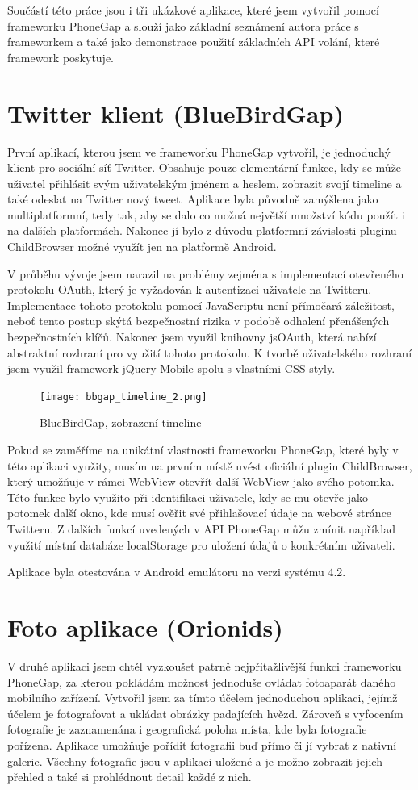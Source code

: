 Součástí této práce jsou i tři ukázkové aplikace, které jsem vytvořil pomocí frameworku PhoneGap a slouží jako základní seznámení autora práce s frameworkem a také jako demonstrace použití základních API volání, které framework poskytuje.

\section{Twitter klient (BlueBirdGap)}
První aplikací, kterou jsem ve frameworku PhoneGap vytvořil, je jednoduchý klient pro sociální síť Twitter. Obsahuje pouze elementární funkce, kdy se může uživatel přihlásit svým uživatelským jménem a heslem, zobrazit svojí timeline a také odeslat na Twitter nový tweet. Aplikace byla původně zamýšlena jako multiplatformní, tedy tak, aby se dalo co možná největší množství kódu použít i na dalších platformách. Nakonec jí bylo z důvodu platformní závislosti pluginu ChildBrowser možné využít jen na platformě Android.

V průběhu vývoje jsem narazil na problémy zejména s implementací otevřeného protokolu OAuth, který je vyžadován k autentizaci uživatele na Twitteru. Implementace tohoto protokolu pomocí JavaScriptu není přímočará záležitost, neboť tento postup skýtá bezpečnostní rizika v podobě odhalení přenášených bezpečnostních klíčů. Nakonec jsem využil knihovny jsOAuth, která nabízí abstraktní rozhraní pro využití tohoto protokolu. K tvorbě uživatelského rozhraní jsem využil framework jQuery Mobile spolu s vlastními CSS styly.

\begin{figure}[htbp]\centering
\texttt{[image: bbgap\_timeline\_2.png]}
\caption{BlueBirdGap, zobrazení timeline}
\label{fig:BbGapTimeline}
\end{figure}

Pokud se zaměříme na unikátní vlastnosti frameworku PhoneGap, které byly v této aplikaci využity, musím na prvním místě uvést oficiální plugin ChildBrowser, který umožňuje v rámci WebView otevřít další WebView jako svého potomka. Této funkce bylo využito při identifikaci uživatele, kdy se mu otevře jako potomek další okno, kde musí ověřit své přihlašovací údaje na webové stránce Twitteru. Z dalších funkcí uvedených v API PhoneGap můžu zmínit například využití místní databáze localStorage pro uložení údajů o konkrétním uživateli.

Aplikace byla otestována v Android emulátoru na verzi systému 4.2.

\section{Foto aplikace (Orionids)}
V druhé aplikaci jsem chtěl vyzkoušet patrně nejpřitažlivější funkci frameworku PhoneGap, za kterou pokládám možnost jednoduše ovládat fotoaparát daného mobilního zařízení. Vytvořil jsem za tímto účelem jednoduchou aplikaci, jejímž účelem je fotografovat a ukládat obrázky padajících hvězd. Zároveň s vyfocením fotografie je zaznamenána i geografická poloha místa, kde byla fotografie pořízena. Aplikace umožňuje pořídit fotografii buď přímo či jí vybrat z nativní galerie. Všechny fotografie jsou v aplikaci uložené a je možno zobrazit jejich přehled a také si prohlédnout detail každé z nich.

